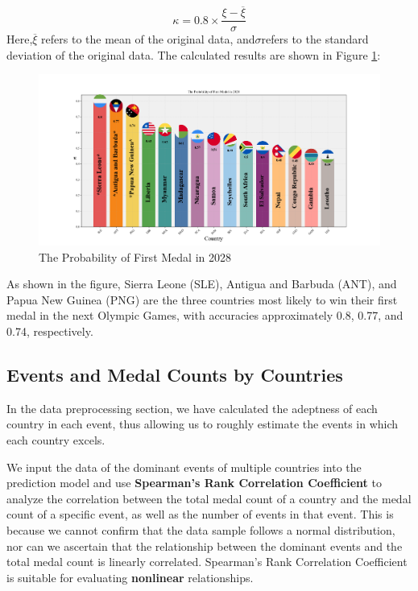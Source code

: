 \documentclass[12pt]{article}  %
\begin{document}
\begin{equation}
	\kappa = 0.8 \times \frac{\xi - \overline{\xi}}{\sigma}
\end{equation}
Here,$\overline{\xi}$ refers to the mean of the original data, and$\sigma$refers to the standard deviation of the original data.
The calculated results are shown in Figure \ref{fig:First Medal}:
\begin{figure}[htbp]
	\centering
	\includegraphics[width=16cm]{img/First.png}
	\caption{The Probability of First Medal in 2028}
	\label{fig:First Medal}
\end{figure}


As shown in the figure, Sierra Leone (SLE), Antigua and Barbuda (ANT), and Papua New Guinea (PNG) are the three countries most likely to win their first medal in the next Olympic Games, with accuracies approximately 0.8, 0.77, and 0.74, respectively.


\subsection{Events and Medal Counts by Countries}
In the data preprocessing section, we have calculated the adeptness of each country in each event, thus allowing us to roughly estimate the events in which each country excels.

We input the data of the dominant events of multiple countries into the prediction model and use \textbf{Spearman's Rank Correlation Coefficient} to analyze the correlation between the total medal count of a country and the medal count of a specific event, as well as the number of events in that event. This is because we cannot confirm that the data sample follows a normal distribution, nor can we ascertain that the relationship between the dominant events and the total medal count is linearly correlated. Spearman's Rank Correlation Coefficient is suitable for evaluating \textbf{nonlinear} relationships.
\end{document}
